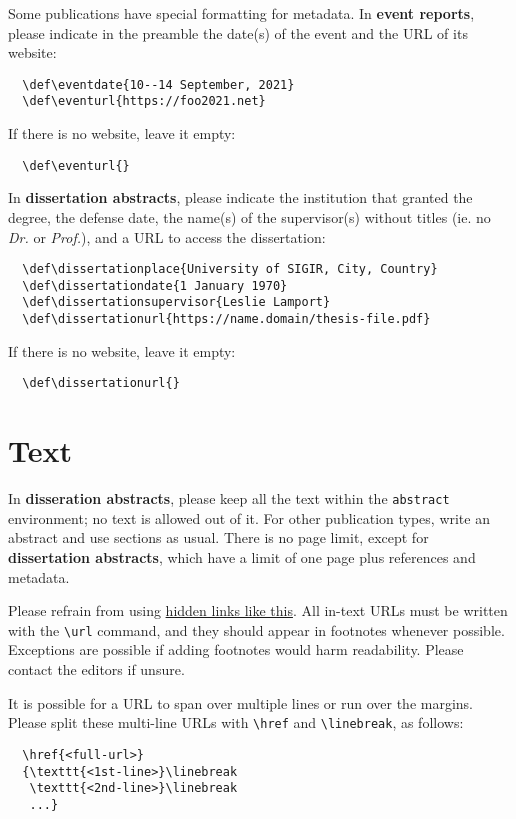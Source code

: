 \documentclass[news]{sigirforum}
\begin{document}
Some publications have special formatting for metadata. In \textbf{event reports}, please indicate in the preamble the date(s) of the event and the URL of its website:
\begin{verbatim}
  \def\eventdate{10--14 September, 2021}
  \def\eventurl{https://foo2021.net}
\end{verbatim}
If there is no website, leave it empty:
\begin{verbatim}
  \def\eventurl{}
\end{verbatim}

In \textbf{dissertation abstracts}, please indicate the institution that granted the degree, the defense date, the name(s) of the supervisor(s) without titles (ie. no \textsl{Dr.} or \textsl{Prof.}), and a URL to access the dissertation:
\begin{verbatim}
  \def\dissertationplace{University of SIGIR, City, Country}
  \def\dissertationdate{1 January 1970}
  \def\dissertationsupervisor{Leslie Lamport}
  \def\dissertationurl{https://name.domain/thesis-file.pdf}
\end{verbatim}
If there is no website, leave it empty:
\begin{verbatim}
  \def\dissertationurl{}
\end{verbatim}

\section{Text}

In \textbf{disseration abstracts}, please keep all the text within the \texttt{abstract} environment; no text is allowed out of it. For other publication types, write an abstract and use sections as usual. There is no page limit, except for \textbf{dissertation abstracts}, which have a limit of one page plus references and metadata.

Please refrain from using \href{https://sigir.org}{hidden links like this}. All in-text URLs must be written with the \texttt{\textbackslash url} command, and they should appear in footnotes whenever possible. Exceptions are possible if adding footnotes would harm readability. Please contact the editors if unsure.

It is possible for a URL to span over multiple lines or run over the margins. Please split these multi-line URLs with \texttt{\textbackslash href} and \texttt{\textbackslash linebreak}, as follows:
\begin{verbatim}
  \href{<full-url>}
  {\texttt{<1st-line>}\linebreak
   \texttt{<2nd-line>}\linebreak
   ...}
\end{verbatim}
\end{document}
